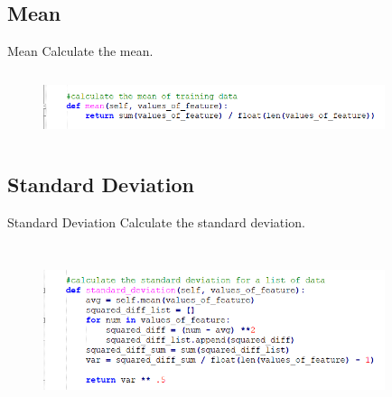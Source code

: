 \documentclass{beamer}
\begin{document}
\subsection{Mean}
    \begin{frame}{Mean}
        \hspace{0.5cm} Calculate the mean.
        \begin{center}
            \begin{figure}
                \begin{center}
                    \includegraphics[width = 10cm, height = 2cm]{Theme/images/mean.PNG}
                \end{center}
            \end{figure}
        \end{center}
    \end{frame}

\subsection{Standard Deviation}
    \begin{frame}{Standard Deviation}
        \hspace{0.5cm} Calculate the standard deviation.
        \begin{center}
            \begin{figure}
                \begin{center}
                    \includegraphics[width = 10cm, height = 5cm]{Theme/images/stdev.PNG}
                \end{center}
            \end{figure}
        \end{center}
    \end{frame}
\end{document}
